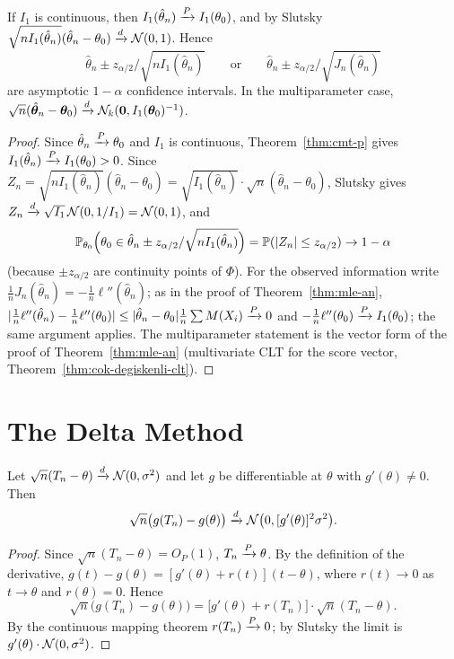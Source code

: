 \documentclass[main.tex]{subfiles}
\begin{document}
\begin{corollary}\label{cor:wald}
If $I_1$ is continuous, then $I_1(\hat\theta_n)\pto I_1(\theta_0)$, and by Slutsky $\sqrt{nI_1(\hat\theta_n)}(\hat\theta_n-\theta_0)\dto\Normal(0,1)$. Hence
\[
\hat\theta_n\pm z_{\alpha/2}\big/\sqrt{nI_1(\hat\theta_n)}\qquad\text{or}\qquad\hat\theta_n\pm z_{\alpha/2}\big/\sqrt{J_n(\hat\theta_n)}
\]
are asymptotic $1-\alpha$ confidence intervals. In the multiparameter case, $\sqrt n(\hat{\bm\theta}_n-\bm\theta_0)\dto\Normal_k(\mathbf 0,I_1(\bm\theta_0)^{-1})$.
\end{corollary}
\begin{proof}
Since $\hat\theta_n\pto\theta_0$ and $I_1$ is continuous, Theorem~\ref{thm:cmt-p} gives $I_1(\hat\theta_n)\pto I_1(\theta_0)>0$. Since $Z_n=\sqrt{nI_1(\hat\theta_n)}(\hat\theta_n-\theta_0)=\sqrt{I_1(\hat\theta_n)}\cdot\sqrt n(\hat\theta_n-\theta_0)$, Slutsky gives $Z_n\dto\sqrt{I_1}\,\Normal(0,1/I_1)=\Normal(0,1)$, and
\[
\P_{\theta_0}\Big(\theta_0\in\hat\theta_n\pm z_{\alpha/2}/\sqrt{nI_1(\hat\theta_n)}\Big)=\P(|Z_n|\le z_{\alpha/2})\to1-\alpha
\]
(because $\pm z_{\alpha/2}$ are continuity points of $\Phi$). For the observed information write $\frac1nJ_n(\hat\theta_n)=-\frac1n\ell''(\hat\theta_n)$; as in the proof of Theorem~\ref{thm:mle-an}, $|\frac1n\ell''(\hat\theta_n)-\frac1n\ell''(\theta_0)|\le|\hat\theta_n-\theta_0|\frac1n\sum M(X_i)\pto0$ and $-\frac1n\ell''(\theta_0)\pto I_1(\theta_0)$; the same argument applies. The multiparameter statement is the vector form of the proof of Theorem~\ref{thm:mle-an} (multivariate CLT for the score vector, Theorem~\ref{thm:cok-degiskenli-clt}).
\end{proof}

\section{The Delta Method}

\begin{theorem}\label{thm:delta}
Let $\sqrt{n}(T_n - \theta) \dto \Normal(0, \sigma^2)$ and let $g$ be differentiable at $\theta$ with $g'(\theta)\neq0$. Then
\[
\sqrt{n}\big(g(T_n) - g(\theta)\big) \dto \Normal\big(0, [g'(\theta)]^2 \sigma^2\big).
\]
\end{theorem}
\begin{proof}
Since $\sqrt n(T_n-\theta)=O_P(1)$, $T_n\pto\theta$. By the definition of the derivative, $g(t)-g(\theta)=[g'(\theta)+r(t)](t-\theta)$, where $r(t)\to0$ as $t\to\theta$ and $r(\theta)=0$. Hence
\[
\sqrt n\big(g(T_n)-g(\theta)\big)=\big[g'(\theta)+r(T_n)\big]\cdot\sqrt n(T_n-\theta).
\]
By the continuous mapping theorem $r(T_n)\pto0$; by Slutsky the limit is $g'(\theta)\cdot\Normal(0,\sigma^2)$.
\end{proof}
\end{document}
